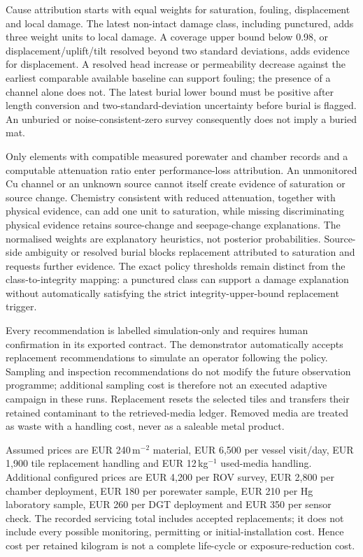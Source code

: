 Cause attribution starts with equal weights for saturation, fouling, displacement and local damage. The latest non-intact damage class, including punctured, adds three weight units to local damage. A coverage upper bound below 0.98, or displacement/uplift/tilt resolved beyond two standard deviations, adds evidence for displacement. A resolved head increase or permeability decrease against the earliest comparable available baseline can support fouling; the presence of a channel alone does not. The latest burial lower bound must be positive after length conversion and two-standard-deviation uncertainty before burial is flagged. An unburied or noise-consistent-zero survey consequently does not imply a buried mat.

Only elements with compatible measured porewater and chamber records and a computable attenuation ratio enter performance-loss attribution. An unmonitored Cu channel or an unknown source cannot itself create evidence of saturation or source change. Chemistry consistent with reduced attenuation, together with physical evidence, can add one unit to saturation, while missing discriminating physical evidence retains source-change and seepage-change explanations. The normalised weights are explanatory heuristics, not posterior probabilities. Source-side ambiguity or resolved burial blocks replacement attributed to saturation and requests further evidence. The exact policy thresholds remain distinct from the class-to-integrity mapping: a punctured class can support a damage explanation without automatically satisfying the strict integrity-upper-bound replacement trigger.

Every recommendation is labelled simulation-only and requires human confirmation in its exported contract. The demonstrator automatically accepts replacement recommendations to simulate an operator following the policy. Sampling and inspection recommendations do not modify the future observation programme; additional sampling cost is therefore not an executed adaptive campaign in these runs. Replacement resets the selected tiles and transfers their retained contaminant to the retrieved-media ledger. Removed media are treated as waste with a handling cost, never as a saleable metal product.

Assumed prices are EUR 240\,m$^{-2}$ material, EUR 6,500 per vessel visit/day, EUR 1,900 tile replacement handling and EUR 12\,kg$^{-1}$ used-media handling. Additional configured prices are EUR 4,200 per ROV survey, EUR 2,800 per chamber deployment, EUR 180 per porewater sample, EUR 210 per Hg laboratory sample, EUR 260 per DGT deployment and EUR 350 per sensor check. The recorded servicing total includes accepted replacements; it does not include every possible monitoring, permitting or initial-installation cost. Hence cost per retained kilogram is not a complete life-cycle or exposure-reduction cost.

